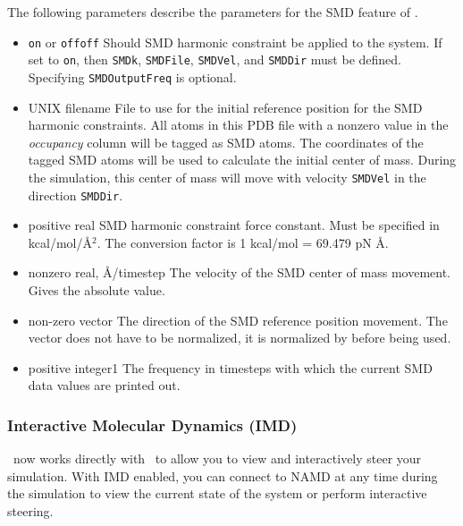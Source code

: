 The following parameters describe the parameters for the 
SMD feature of \NAMD.
\begin{itemize}
\item 
{}
{{\tt on} or {\tt off}}{{\tt off}}
{Should SMD harmonic constraint be applied to the system. If set 
to {\tt on}, then  {\tt SMDk}, {\tt SMDFile}, {\tt SMDVel}, and
{\tt SMDDir} must be defined.  Specifying {\tt SMDOutputFreq} 
is optional.}

\item
{}
{UNIX filename} {File to use for the initial reference position for the SMD
harmonic constraints.  All atoms in this PDB file with a nonzero value in the
{\em occupancy} column will be tagged as SMD atoms.  The coordinates of the
tagged SMD atoms will be used to calculate the initial center of mass.
During the simulation, this center of mass will move with velocity
{\tt SMDVel} in the direction {\tt SMDDir}.}

\item
{}
{positive real}
{SMD harmonic constraint force constant. Must be specified in
kcal/mol/\AA$^2$. The conversion factor is 1 kcal/mol = 69.479 pN \AA.} 

\item
{}
{nonzero real, \AA/timestep}
{The velocity of the SMD center of mass movement. Gives the absolute
value.}

\item
{}
{non-zero vector}
{The direction of the SMD reference position movement. The vector does
not have to be normalized, it is normalized by \NAMD before being used.}

\item
{}
{positive integer}{1} {The frequency in timesteps with which the
current SMD data values are printed out.}
\end{itemize}


\subsubsection{Interactive Molecular Dynamics (IMD)}

\NAMD\ now works directly with \VMD\ to allow you to view and interactively
steer your simulation.  With IMD enabled, you can connect to NAMD at any
time during the simulation to view the current state of the system or perform
interactive steering. 

